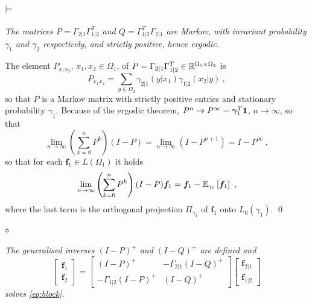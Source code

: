 \documentclass[runningheads]{llncs}
\begin{document}
\paragraph{$\bf\models$} \emph{The matrices $P = \Gamma_{2|1}\Gamma_{1|2}^T$ and $Q = \Gamma_{1|2}^T\Gamma_{2|1}$ are Markov, with invariant probability $\gamma_1$ and $\gamma_2$ respectively, and strictly positive, hence ergodic.}

The element $P_{x_1x_2}$, $x_1,x_2 \in \Omega_1$, of $P = \Gamma_{2|1}\Gamma_{1|2}^T \in \mathbb R^{\Omega_1 \times \Omega_2}$ is
%
\begin{equation*}
  P_{x_1x_2} = \sum_{y \in \Omega_2} \gamma_{2|1}(y|x_1) \gamma_{1|2}(x_2|y) \ ,
\end{equation*}
%
so that $P$ is a Markov matrix with strictly positive entries and stationary probability $\gamma_1$. Because of the ergodic theorem, $P^n \to P^\infty = {\bm \gamma}_1^T \bm 1$, $n \to \infty$, so that 
%
\begin{equation*}
\lim_{n\to\infty} \left(\sum_{k=0}^n P^k\right)(I-P) = \lim_{n\to\infty} \left(I - P^{n+1}\right) = I - P^\infty \ , 
\end{equation*}
%
so that for each $\bm f_1 \in L(\Omega_1)$ it holds
%
\begin{equation*}
  \lim_{n\to\infty} \left(\sum_{k=0}^n P^k\right)(I-P) \bm f_1 = \bm f_1 - {\operatorname{\mathbb E}}_{\gamma_1}\left[\bm f_1\right] \ ,
\end{equation*}
%
where the last term is the orthogonal projection $\Pi_{\gamma_1}$ of $\bm f_1$ onto $L_0(\gamma_1)$. \qed

\paragraph{$\bf\diamond$} \emph{The generalised inverses $(I-P)^+$ and $(I-Q)^+$ are defined and 
%
  \begin{equation*}
  \begin{bmatrix}
    \bm f_1 \\ \bm f_2
  \end{bmatrix}
=
    \begin{bmatrix}
      (I - P)^+ & - \Gamma_{2|1}(I - Q)^+ \\
- \Gamma_{1|2}(I-P)^+ & (I-Q)^+
    \end{bmatrix}
    \begin{bmatrix}
      \bm f_{2|1} \\ \bm f_{1|2}
    \end{bmatrix}
  \end{equation*}
%
solves \cref{eq:block}.}
\end{document}
